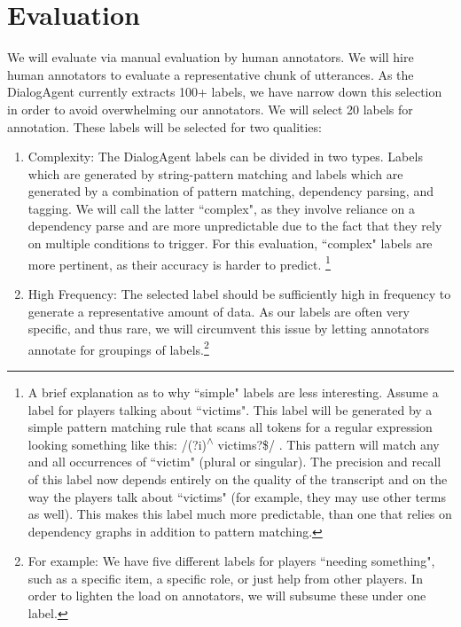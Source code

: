 \section{Evaluation}

We will evaluate via manual evaluation by human annotators. We will hire human
annotators to evaluate a representative chunk of utterances. As the DialogAgent
currently extracts 100+ labels, we have narrow down this selection in order to
avoid overwhelming our annotators.  We will select 20 labels for annotation.
These labels will be selected for two qualities:

\begin{enumerate}

\item Complexity: The DialogAgent labels can be divided in two types. Labels
    which are generated by string-pattern matching and labels which are
    generated by a combination of pattern matching, dependency parsing, and
    tagging. We will call the latter ``complex", as they involve reliance on a
    dependency parse and are more unpredictable due to the fact that they rely
    on multiple conditions to trigger. For this evaluation, ``complex" labels
    are more pertinent, as their accuracy is harder to predict. \footnote{A
        brief explanation as to why ``simple" labels are less interesting.
        Assume a label for players talking about ``victims". This label will be
        generated by a simple pattern matching rule that scans all tokens for a
        regular expression looking something like this: 
               {/(?i){\textsuperscript{$\wedge$} }victims?\$/}
        .  This pattern will match any and all occurrences of
        ``victim" (plural or singular). The precision and recall of this label
        now depends entirely on the quality of the transcript and on the way
        the players talk about ``victims" (for example, they may use other
        terms as well). This makes this label much more predictable, than one
        that relies on dependency graphs in addition to pattern matching.}

\item High Frequency: The selected label should be sufficiently high in
    frequency to generate a representative amount of data. As our labels are
    often very specific, and thus rare, we will circumvent this issue by
    letting annotators annotate for groupings of labels.\footnote{For example:
    We have five different labels for players ``needing something", such as a
specific item, a specific role, or just help from other players. In order to
lighten the load on annotators, we will subsume these under one label.}

\end{enumerate}

